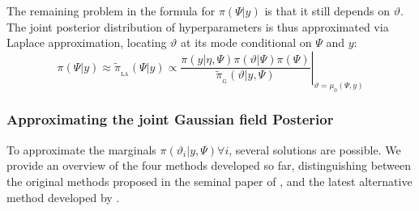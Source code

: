 \documentclass[openany, 11pt, oneside]{book}
\begin{document}

The remaining problem in the formula for $\pi(\Psi \vert y)$ is that it still depends on $\vartheta$. The joint posterior distribution of hyperparameters is thus approximated via Laplace approximation, locating $\vartheta$ at its mode conditional on $\Psi$ and $y$:
\begin{equation}
\pi(\Psi \vert y) \approx \tilde{\pi}_\mathrm{_{LA}}(\Psi \vert y) \propto  \left. \frac{\pi(y \vert \eta, \Psi) \pi(\vartheta \vert \Psi) \pi(\Psi)}{\tilde{\pi}_\mathrm{_G}(\vartheta \vert y, \Psi)} 
\right \vert_{\vartheta = \mu_0(\Psi, y)}
\label{eq:hyper_laplace}
\end{equation}


\subsubsection{Approximating the joint Gaussian field Posterior}\label{par:inla_theta}

To approximate the marginals $\pi(\vartheta_i \vert y, \Psi) \forall i$, several solutions are possible. We provide an overview of the four methods developed so far, distinguishing between the original methods proposed in the seminal paper of \cite{INLA}, and the latest alternative method developed by \cite{VBINLA2024}.
\end{document}
